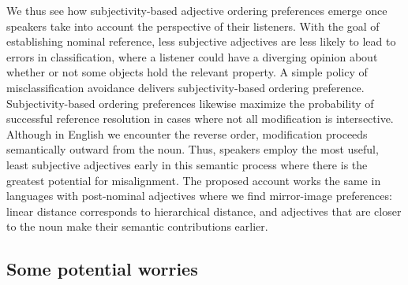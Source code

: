 \documentclass[preprint,authoryear]{elsarticle}\frenchspacing
\begin{document}
We thus see how subjectivity-based adjective ordering preferences emerge once speakers take into account the perspective of their listeners. With the goal of establishing nominal reference, less subjective adjectives are less likely to lead to errors in classification, where a listener could have a diverging opinion about whether or not some objects hold the relevant property. A simple policy of misclassification avoidance delivers subjectivity-based ordering preference. Subjectivity-based ordering preferences likewise maximize the probability of successful reference resolution in cases where not all modification is intersective. 
Although in English we encounter the reverse order, modification proceeds semantically outward from the noun. Thus, speakers employ the most useful, least subjective adjectives early in this semantic process where there is the greatest potential for misalignment. %
The proposed account works the same in languages with post-nominal adjectives where we find mirror-image preferences: linear distance corresponds to hierarchical distance, and adjectives that are closer to the noun make their semantic contributions earlier.


\subsection{Some potential worries}
\end{document}
